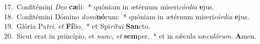 {17.~}Confitémini \textit{De}\textit{o} \textbf{cæ}li:~* quóniam in ætérnum miseri\textit{cór}\textit{di}\textit{a} \textbf{e}jus.\\
{18.~}Confitémini Dómino \textit{do}\textit{mi}\textbf{nó}rum:~* quóniam in ætérnum miseri\textit{cór}\textit{di}\textit{a} \textbf{e}jus.\\
{19.~}Glória Pa\textit{tri}, \textit{et} \textbf{Fí}lio,~* et Spi\textit{rí}\textit{tu}\textit{i} \textbf{San}cto.\\
{20.~}Sicut erat in princípio, et \textit{nunc}, \textit{et} \textbf{sem}per,~* et in sǽcula sæ\textit{cu}\textit{ló}\textit{rum}. \textbf{A}men.\\
